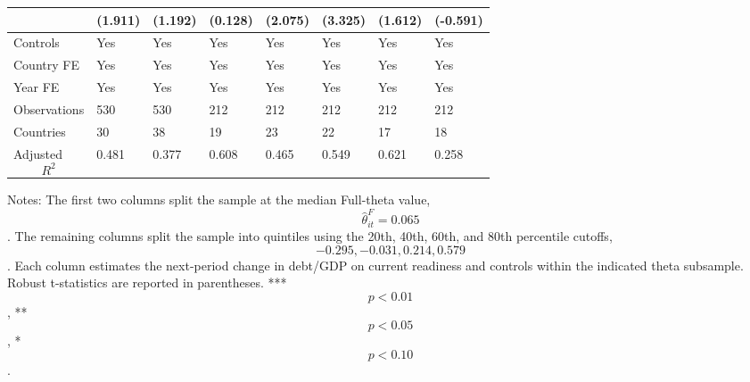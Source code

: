 \begin{table}[H]
\begin{threeparttable}
\begin{tabularx}{\textwidth}{lYYYYYYY}
  & (1.911) & (1.192) & (0.128) & (2.075) & (3.325) & (1.612) & (-0.591) \\
\midrule
Controls & Yes & Yes & Yes & Yes & Yes & Yes & Yes \\
Country FE & Yes & Yes & Yes & Yes & Yes & Yes & Yes \\
Year FE & Yes & Yes & Yes & Yes & Yes & Yes & Yes \\
Observations & 530 & 530 & 212 & 212 & 212 & 212 & 212 \\
Countries & 30 & 38 & 19 & 23 & 22 & 17 & 18 \\
Adjusted $$R^2$$ & 0.481 & 0.377 & 0.608 & 0.465 & 0.549 & 0.621 & 0.258 \\
\bottomrule
\end{tabularx}
\begin{tablenotes}[flushleft]\footnotesize
\item Notes: The first two columns split the sample at the median Full-theta value, $$\widehat{\theta}^{F}_{it}=0.065$$. The remaining columns split the sample into quintiles using the 20th, 40th, 60th, and 80th percentile cutoffs, $$-0.295, -0.031, 0.214, 0.579$$. Each column estimates the next-period change in debt/GDP on current readiness and controls within the indicated theta subsample. Robust t-statistics are reported in parentheses. *** $$p<0.01$$, ** $$p<0.05$$, * $$p<0.10$$.
\end{tablenotes}
\end{threeparttable}
\end{table}
